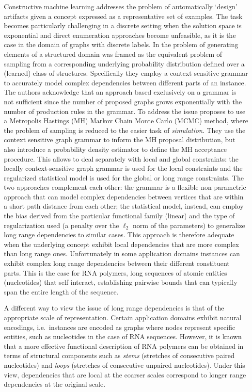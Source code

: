 \documentclass[a4paper]{esannV2}
\begin{document}
Constructive machine learning addresses the problem of automatically `design'
artifacts given a concept expressed as a representative set of examples. The
task becomes particularly challenging in a discrete setting when the solution
space is exponential and direct enumeration approaches become unfeasible, as
it is the case in the domain of graphs with discrete labels. In \cite{costa16}
the problem of generating elements of a structured domain was framed as the
equivalent problem of sampling from a corresponding underlying probability
distribution defined over a (learned) class of structures. Specifically they
employ a context-sensitive grammar to accurately model complex dependencies
between different parts of an instance. The authors acknowledge that an
approach based exclusively on a grammar is not sufficient since the number of
proposed graphs grows exponentially with the number of production rules in the
grammar. To address the issue \cite{costa16} proposes to use a Metropolis
Hastings (MH) Markov Chain Monte Carlo (MCMC) method, where the problem of
sampling is reduced to the easier task of {\em simulation}. They use the
context sensitive graph grammar to inform the MH proposal distribution, but
also introduce a probability density estimator to define the MH acceptance
procedure. This allows to deal separately with local and global constraints:
the locally context-sensitive graph grammar is used for the local constraints
and the regularized statistical model is used for the global or long range
constraints. The two approaches complement each other: the grammar is a
flexible non-parametric approach that can model complex dependencies between
vertices that are within a short path distance from each other; the
statistical model, instead, can employ the bias derived from the particular
functional family (linear) and the type of regularization used (a penalty over
the $\ell_2$ norm of the parameters) to generalize long range dependencies to
similar cases. This approach is therefore adequate when the underlying concept
exhibit local dependencies that are more complex than long range ones.
Unfortunately in some application domains instances can exhibit complex long
range dependencies between their different constituent parts. This is the case
for RNA polymers, long sequences of atomic entities (nucleotides) that self
interact, establishing pairwise bounds that can typically span the entire
length of the sequence.

A different way to view the issue of long range dependencies is that of the
appropriate scale of representation. Certain application domains exhibit
natural encodings, i.e.\ instances are encoded as graphs where nodes represent
specific entities, such as nucleotides in the case of RNA sequences. However,
it is known that a more effective functional description of RNA polymers can
be obtained in terms of structural components such as {\em stems} \/(stretches
of consecutive paired nucleotides) and {\em loops} \/(stretches of consecutive
unpaired nucleotides). Under this view, dependencies that are local at the
coarser scales correspond to longer range dependencies at the original scale.
\end{document}
